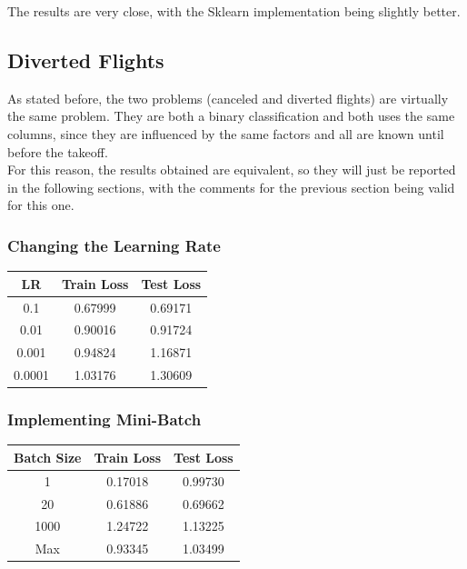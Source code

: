 \documentclass[
	letterpaper, %
	10pt, %
]{class}
\begin{document}
The results are very close, with the Sklearn implementation being slightly better.

\subsection{Diverted Flights}

As stated before, the two problems (canceled and diverted flights) are virtually the same problem. They are both a binary classification and both uses the same columns, since they are influenced by the same factors and all are known until before the takeoff.\\

For this reason, the results obtained are equivalent, so they will just be reported in the following sections, with the comments for the previous section being valid for this one.

\subsubsection{Changing the Learning Rate}

\begin{center}
    \begin{tabular}{ |c|c|c| }
        \hline
        LR     & Train Loss & Test Loss \\
        \hline
        0.1    & 0.67999    & 0.69171   \\
        0.01   & 0.90016    & 0.91724   \\
        0.001  & 0.94824    & 1.16871   \\
        0.0001 & 1.03176    & 1.30609   \\
        \hline
    \end{tabular}
\end{center}

\subsubsection{Implementing Mini-Batch}

\begin{center}
    \begin{tabular}{ |c|c|c| }
        \hline
        Batch Size & Train Loss & Test Loss \\
        \hline
        1          & 0.17018    & 0.99730   \\
        20         & 0.61886    & 0.69662   \\
        1000       & 1.24722    & 1.13225   \\
        Max        & 0.93345    & 1.03499   \\
        \hline
    \end{tabular}
\end{center}
\end{document}
